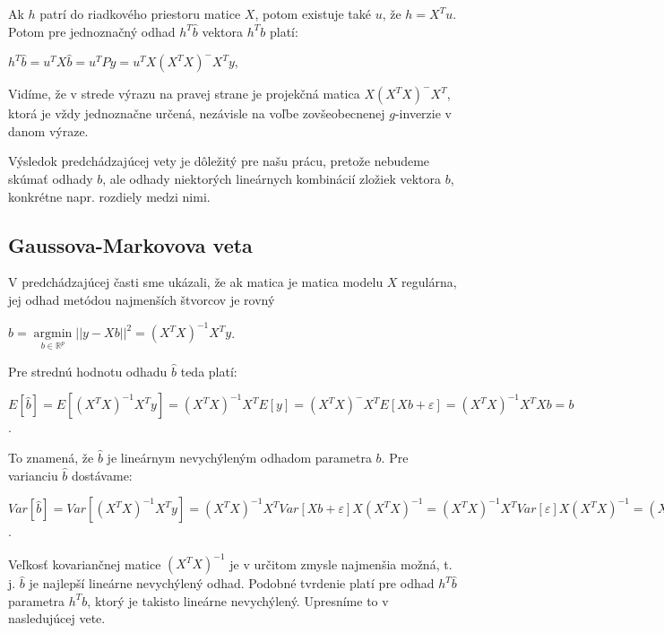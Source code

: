 Ak $h$ patrí do riadkového priestoru matice $X$, potom existuje také $u$, že $h = X^T u$.
Potom pre jednoznačný odhad $h^T \hat{b}$ vektora $h^T b$ platí:

\begin{center}
$h^T \hat{b} = u^T X \hat{b} = u^T P y = u^T X(X^T X)^- X^T y$,
\end{center}

Vidíme, že v strede výrazu na pravej strane je projekčná matica $X(X^T X)^- X^T$, ktorá je vždy jednoznačne určená, 
nezávisle na voľbe zovšeobecnenej $g$-inverzie v danom výraze.

Výsledok predchádzajúcej vety je dôležitý pre našu prácu, pretože nebudeme skúmať odhady $b$,
ale odhady niektorých lineárnych kombinácií zložiek vektora $b$, 
konkrétne napr. rozdiely medzi nimi.

\subsection{Gaussova-Markovova veta}

V predchádzajúcej časti sme ukázali, že ak matica je matica modelu $X$ regulárna,
jej odhad metódou najmenších štvorcov je rovný

\begin{center}
$
\hat{b} = \underset{b \in \mathbb{R}^{p}}{\operatorname{arg min}} ||y - Xb||^2 = (X^T X)^{-1} X^T y
$.
\end{center}

Pre strednú hodnotu odhadu $\hat{b}$ teda platí:

\begin{center}
$
E[\hat{b}] = E[(X^T X)^{-1} X^T y] = (X^T X)^{-1} X^T E[y] = (X^T X)^- X^T E[Xb + \varepsilon] = (X^T X)^{-1} X^T X b = b
$.
\end{center}

To znamená, že $\hat{b}$ je lineárnym nevychýleným odhadom parametra $b$.
Pre varianciu $\hat{b}$ dostávame:

\begin{center}
$
Var[\hat{b}] = Var[(X^T X)^{-1} X^T y] = (X^T X)^{-1} X^T Var[Xb + \varepsilon] X (X^T X)^{-1} =
(X^T X)^{-1} X^T Var[\varepsilon] X (X^T X)^{-1} = (X^T X)^{-1} X^T I X (X^T X)^{-1} = (X^T X)^{-1}
$.
\end{center}

Veľkosť kovariančnej matice $(X^T X)^{-1}$ je v určitom zmysle najmenšia možná, t. j. $\hat{b}$ je najlepší lineárne nevychýlený odhad.
Podobné tvrdenie platí pre odhad $h^T \hat{b}$ parametra $h^T b$, ktorý je takisto lineárne nevychýlený. Upresníme to v nasledujúcej vete.

